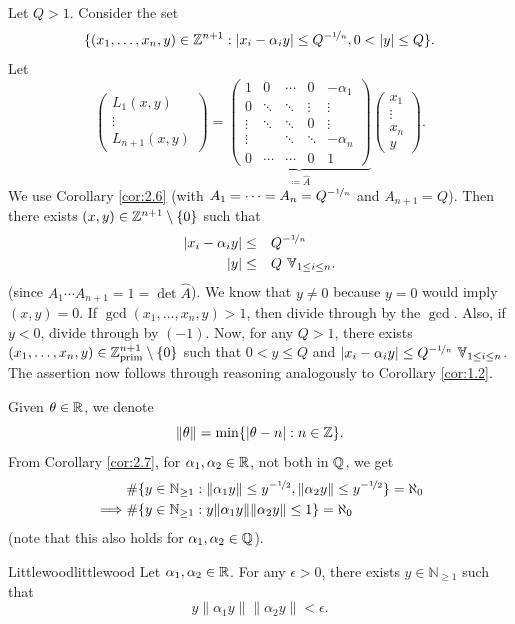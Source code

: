 \documentclass{Vorlesungstemplate_English} %
\renewcommand{\N}{\mathbb{N}_{\geq 1}}
\begin{document}
  \begin{pf}
    Let $Q > 1$. Consider the set
    \[ \{ (x_1, \dots, x_n, y) \in \mathbb{Z}^{n+1}: |x_i-\alpha_iy| \leq Q^{-\nicefrac{1}{n}}, 0 < |y| \leq Q\}.\]
    Let
    \[ \begin{pmatrix}
      L_1(x,y) \\
      \vdots \\
      L_{n+1}(x,y)
    \end{pmatrix} = \underbrace{\begin{pmatrix}
      1 & 0 & \cdots & 0 & -\alpha_1 \\
      0 & \ddots & \ddots & \vdots & \vdots \\
      \vdots & \ddots & \ddots & 0 & \vdots \\
      \vdots & & \ddots & \ddots & -\alpha_{n} \\
      0 & \cdots & \cdots & 0 & 1\end{pmatrix}}_{\coloneq \widehat{A}}\begin{pmatrix}
        x_1 \\
        \vdots \\
        x_n \\
        y
      \end{pmatrix}.\]
    We use Corollary \ref{cor:2.6} (with $A_1 = \dots = A_n = Q^{-\nicefrac{1}{n}}$ and $A_{n+1}=Q$). Then there exists $(x,y) \in \mathbb{Z}^{n+1}\setminus \{ 0\}$ such that
    \begin{align*}
      |x_i-\alpha_iy| \leq \quad & Q^{-\nicefrac{1}{n}} \\
      |y| \leq \quad & Q \forall_{1 \leq i \leq n}.
    \end{align*}
    (since $A_1\cdots A_{n+1} = 1 = \det\widehat{A}$). We know that $y \neq 0$ because $y = 0$ would imply $(x,y) = 0$. If $\gcd(x_1, \dots, x_n,y) > 1$, then divide through by the $\gcd$. Also, if $y < 0$, divide through by $(-1)$. Now, for any $Q > 1$, there exists $(x_1, \dots, x_n,y) \in \mathbb{Z}_{\text{prim}}^{n+1} \setminus \{ 0\}$ such that $0 < y \leq Q$ and $|x_i-\alpha_iy| \leq Q^{-\nicefrac{1}{n}} \forall_{1 \leq i \leq n}$. The assertion now follows through reasoning analogously to Corollary \ref{cor:1.2}.
  \end{pf}
  Given $\theta \in \mathbb{R}$, we denote
  \[ \|\theta\| = \min\{ |\theta-n|: n \in \mathbb{Z}\}.\]
  From Corollary \ref{cor:2.7}, for $\alpha_1,\alpha_2 \in \mathbb{R}$, not both in $\mathbb{Q}$, we get
  \begin{align*}
    & \# \{ y \in \N: \|\alpha_1y\| \leq y^{-\nicefrac{1}{2}}, \|\alpha_2y\| \leq y^{-\nicefrac{1}{2}}\} = \aleph_0 \\
    \implies & \#\{ y \in \N: y\|\alpha_1y\|\|\alpha_2y\| \leq 1\} = \aleph_0
  \end{align*}
  (note that this also holds for $\alpha_1,\alpha_2 \in \mathbb{Q}$).
  \begin{hypothesis}{Littlewood}{littlewood}
    Let $\alpha_1,\alpha_2 \in \mathbb{R}$. For any $\epsilon > 0$, there exists $y \in \N$ such that
    \[ y\|\alpha_1y\|\|\alpha_2y\| < \epsilon.\]
  \end{hypothesis}
\end{document}
